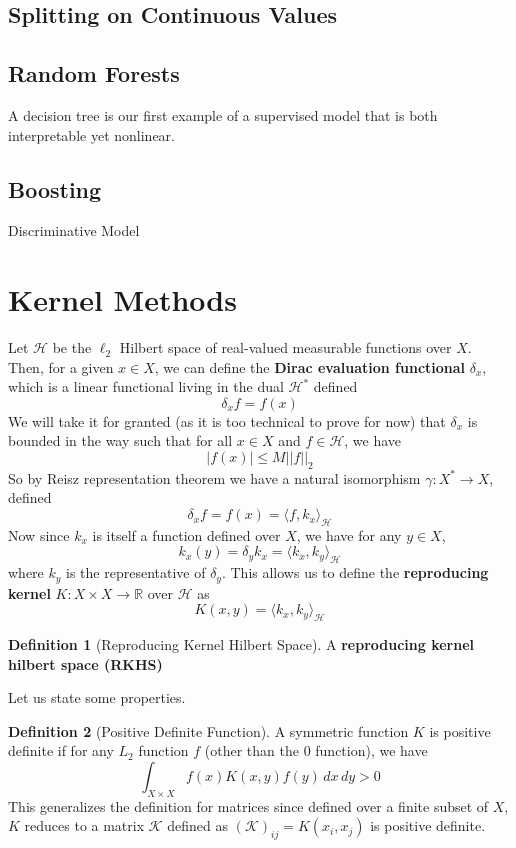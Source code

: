 \documentclass{article}
\theoremstyle{definition}
\theoremstyle{remark}
\theoremstyle{definition}
\newtheorem{definition}{Definition}[section]
\begin{document}
\subsection{Splitting on Continuous Values}



\subsection{Random Forests}
A decision tree is our first example of a supervised model that is both interpretable yet nonlinear. 


\subsection{Boosting}



Discriminative Model

\section{Kernel Methods} 

Let $\mathcal{H}$ be the $\ell_2$ Hilbert space of real-valued measurable functions over $X$. Then, for a given $x \in X$, we can define the \textbf{Dirac evaluation functional} $\delta_x$, which is a linear functional living in the dual $\mathcal{H}^\ast$ defined 
\[\delta_x f = f(x)\]
We will take it for granted (as it is too technical to prove for now) that $\delta_x$ is bounded in the way such that for all $x \in X$ and $f \in \mathcal{H}$, we have 
\[|f(x)| \leq M ||f||_2 \]
So by Reisz representation theorem we have a natural isomorphism $\gamma: X^\ast \rightarrow X$, defined 
\[\delta_x f = f(x) = \langle f, k_x \rangle_{\mathcal{H}}\]
Now since $k_x$ is itself a function defined over $X$, we have for any $y \in X$, 
\[k_x (y) = \delta_y k_x = \langle k_x, k_y \rangle_{\mathcal{H}}\]
where $k_y$ is the representative of $\delta_y$. This allows us to define the \textbf{reproducing kernel} $K: X \times X \rightarrow \mathbb{R}$ over $\mathcal{H}$ as 
\[K(x, y) = \langle k_x, k_y \rangle_{\mathcal{H}}\]


\begin{definition}[Reproducing Kernel Hilbert Space]
    A \textbf{reproducing kernel hilbert space (RKHS)}
\end{definition}


Let us state some properties. 

\begin{definition}[Positive Definite Function]
    A symmetric function $K$ is positive definite if for any $L_2$ function $f$ (other than the $0$ function), we have 
    \[\int_{X \times X} f(x) K(x, y) f(y) \,dx \,dy > 0\]
    This generalizes the definition for matrices since defined over a finite subset of $X$, $K$ reduces to a matrix $\mathcal{K}$ defined as $(\mathcal{K})_{ij} = K(x_i, x_j)$ is positive definite. 
\end{definition}
\end{document}
